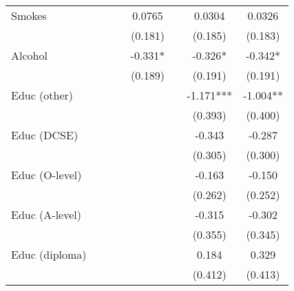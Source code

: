\begin{table}[h!]
{\begin{tabular}{l*{7}{c}}
Smokes       &               &               &               &      0.0765   &               &      0.0304   &      0.0326   \\
            &               &               &               &     (0.181)   &               &     (0.185)   &     (0.183)   \\

Alcohol     &               &               &               &      -0.331*  &               &      -0.326*  &      -0.342*  \\
            &               &               &               &     (0.189)   &               &     (0.191)   &     (0.191)   \\

Educ (other)  &               &               &               &               &               &      -1.171***&      -1.004** \\
            &               &               &               &               &               &     (0.393)   &     (0.400)   \\

Educ (DCSE) &               &               &               &               &               &      -0.343   &      -0.287   \\
            &               &               &               &               &               &     (0.305)   &     (0.300)   \\

Educ (O-level) &               &               &               &               &               &      -0.163   &      -0.150   \\
            &               &               &               &               &               &     (0.262)   &     (0.252)   \\

Educ (A-level) &               &               &               &               &               &      -0.315   &      -0.302   \\
            &               &               &               &               &               &     (0.355)   &     (0.345)   \\

Educ (diploma) &               &               &               &               &               &       0.184   &       0.329   \\
            &               &               &               &               &               &     (0.412)   &     (0.413)   \\


\end{tabular}}
\end{table}
